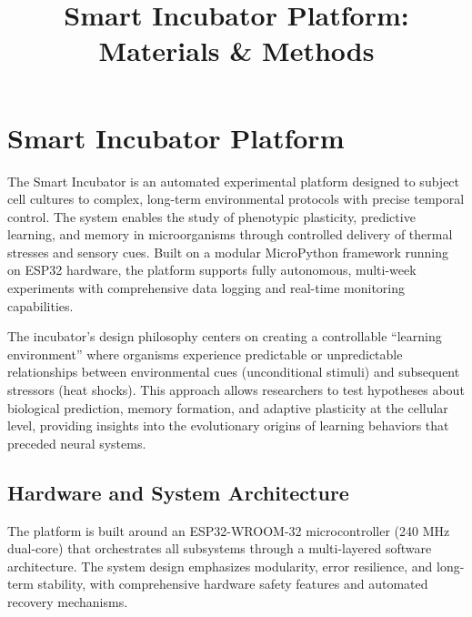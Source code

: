 \documentclass[11pt,a4paper]{article}
\title{\textbf{Smart Incubator Platform: Materials \& Methods}}
\author{}
\date{}
\begin{document}
\maketitle

\section{Smart Incubator Platform}

The Smart Incubator is an automated experimental platform designed to subject cell cultures to complex, long-term environmental protocols with precise temporal control. The system enables the study of phenotypic plasticity, predictive learning, and memory in microorganisms through controlled delivery of thermal stresses and sensory cues. Built on a modular MicroPython framework running on ESP32 hardware, the platform supports fully autonomous, multi-week experiments with comprehensive data logging and real-time monitoring capabilities.

The incubator's design philosophy centers on creating a controllable ``learning environment'' where organisms experience predictable or unpredictable relationships between environmental cues (unconditional stimuli) and subsequent stressors (heat shocks). This approach allows researchers to test hypotheses about biological prediction, memory formation, and adaptive plasticity at the cellular level, providing insights into the evolutionary origins of learning behaviors that preceded neural systems.

\subsection{Hardware and System Architecture}

The platform is built around an ESP32-WROOM-32 microcontroller (240 MHz dual-core) that orchestrates all subsystems through a multi-layered software architecture. The system design emphasizes modularity, error resilience, and long-term stability, with comprehensive hardware safety features and automated recovery mechanisms.
\end{document}
